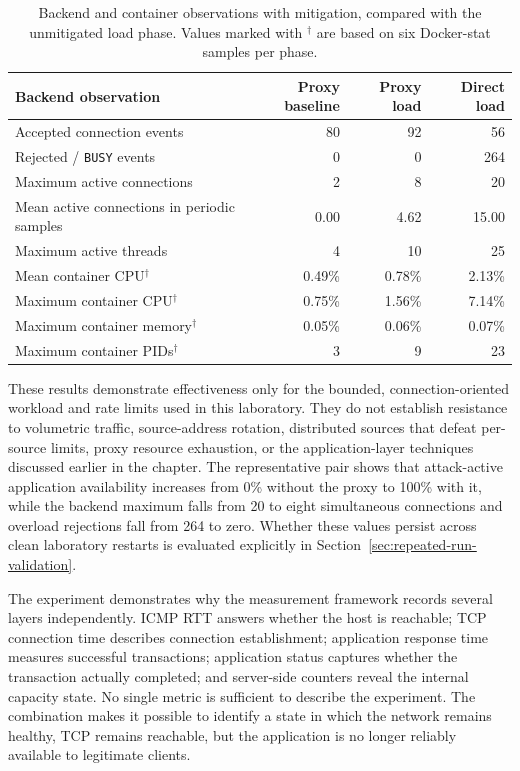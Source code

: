 \begin{table}[htbp]
\centering
\small
\setlength{\tabcolsep}{4pt}
\begin{tabular}{lrrr}
\toprule
\textbf{Backend observation} & \textbf{Proxy baseline} & \textbf{Proxy load} & \textbf{Direct load} \\
\midrule
Accepted connection events & 80 & 92 & 56 \\
Rejected / \texttt{BUSY} events & 0 & 0 & 264 \\
Maximum active connections & 2 & 8 & 20 \\
Mean active connections in periodic samples & 0.00 & 4.62 & 15.00 \\
Maximum active threads & 4 & 10 & 25 \\
Mean container CPU$^{\dagger}$ & 0.49\% & 0.78\% & 2.13\% \\
Maximum container CPU$^{\dagger}$ & 0.75\% & 1.56\% & 7.14\% \\
Maximum container memory$^{\dagger}$ & 0.05\% & 0.06\% & 0.07\% \\
Maximum container PIDs$^{\dagger}$ & 3 & 9 & 23 \\
\bottomrule
\end{tabular}
\caption{Backend and container observations with mitigation, compared with the unmitigated load phase. Values marked with $^{\dagger}$ are based on six Docker-stat samples per phase.}
\label{tab:mitigation-server-comparison}
\end{table}

These results demonstrate effectiveness only for the bounded,
connection-oriented workload and rate limits used in this laboratory. They do
not establish resistance to volumetric traffic, source-address rotation,
distributed sources that defeat per-source limits, proxy resource exhaustion,
or the application-layer techniques discussed earlier in the chapter. The
representative pair shows that attack-active application availability increases
from 0\% without the proxy to 100\% with it, while the backend maximum falls
from 20 to eight simultaneous connections and overload rejections fall from
264 to zero. Whether these values persist across clean laboratory restarts is
evaluated explicitly in Section~\ref{sec:repeated-run-validation}.

The experiment demonstrates why the measurement framework records several
layers independently. ICMP RTT answers whether the host is reachable; TCP
connection time describes connection establishment; application response time
measures successful transactions; application status captures whether the
transaction actually completed; and server-side counters reveal the internal
capacity state. No single metric is sufficient to describe the experiment. The
combination makes it possible to identify a state in which the network remains
healthy, TCP remains reachable, but the application is no longer reliably
available to legitimate clients.


